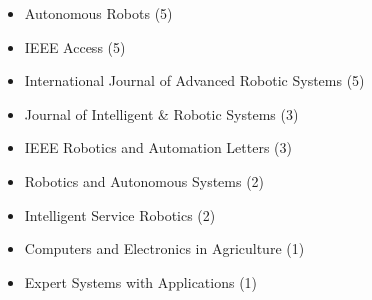\begin{itemize}
	\item Autonomous Robots (5)
	\item IEEE Access (5)
	\item International Journal of Advanced Robotic Systems (5)
	\item Journal of Intelligent \& Robotic Systems (3)
	\item IEEE Robotics and Automation Letters (3)
	\item Robotics and Autonomous Systems (2)	
	\item Intelligent Service Robotics (2)
	\item Computers and Electronics in Agriculture (1)
	\item Expert Systems with Applications (1)
\end{itemize}
